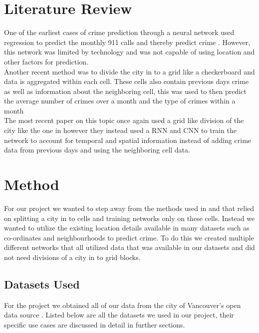 \documentclass[conference]{IEEEtran}
\begin{document}
\section{Literature Review}

One of the earliest cases of crime prediction through a neural network used regression to predict the monthly
911 calls and thereby predict crime \cite{olligschlaegerartificial}. However, this network was limited by technology and 
was not capable of using location and other factors for prediction. \\

Another recent method was to divide the city in to a grid like a checkerboard and data is aggregated within each cell. These
cells also contain previous days crime as well as information about the neighboring cell, this was used to then predict the average
number of crimes over a month and the type of crimes within a month \cite{6137459}\\

The most recent paper on this topic \cite{stec2018forecasting} once again used a grid like division of the city like the one in \cite{6137459} however they instead used
a RNN and CNN to train the network to account for temporal and spatial information instead of adding crime data from previous days and 
using the neighboring cell data. 

\section{Method}

For our project we wanted to step away from the methods used in \cite{stec2018forecasting} and \cite{6137459} that relied on splitting a city in to cells
and training networks only on these cells. Instead we wanted to utilize the existing location details available in many datasets such as co-ordinates and neighbourhoods to
predict crime. To do this we created multiple different networks that all utilized data that was available in our datasets and did not need divisions of a city in to
grid blocks.

\subsection{Datasets Used}

For the project we obtained all of our data from the city of Vancouver’s open data source \cite{data}. Listed below are all the datasets
we used in our project, their specific use cases are discussed in detail in further sections.\\
\end{document}
